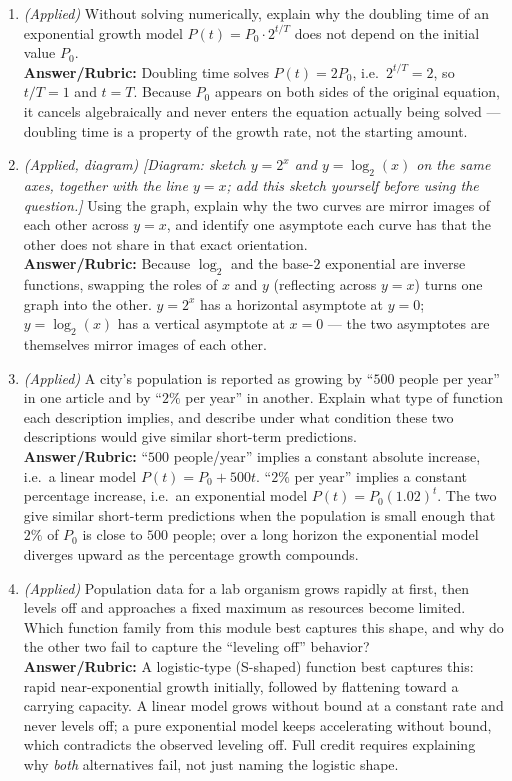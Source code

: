 \documentclass{article}
\begin{document}
\begin{enumerate}[leftmargin=*]
  \item \textit{(Applied)} Without solving numerically, explain why the doubling time of an exponential growth model $P(t)=P_0\cdot2^{t/T}$ does not depend on the initial value $P_0$. \\
  \textbf{Answer/Rubric:} Doubling time solves $P(t)=2P_0$, i.e.\ $2^{t/T}=2$, so $t/T=1$ and $t=T$. Because $P_0$ appears on both sides of the original equation, it cancels algebraically and never enters the equation actually being solved --- doubling time is a property of the growth rate, not the starting amount.

  \item \textit{(Applied, diagram)} \emph{[Diagram: sketch $y=2^x$ and $y=\log_2(x)$ on the same axes, together with the line $y=x$; add this sketch yourself before using the question.]} Using the graph, explain why the two curves are mirror images of each other across $y=x$, and identify one asymptote each curve has that the other does not share in that exact orientation. \\
  \textbf{Answer/Rubric:} Because $\log_2$ and the base-$2$ exponential are inverse functions, swapping the roles of $x$ and $y$ (reflecting across $y=x$) turns one graph into the other. $y=2^x$ has a horizontal asymptote at $y=0$; $y=\log_2(x)$ has a vertical asymptote at $x=0$ --- the two asymptotes are themselves mirror images of each other.

  \item \textit{(Applied)} A city's population is reported as growing by ``$500$ people per year'' in one article and by ``$2\%$ per year'' in another. Explain what type of function each description implies, and describe under what condition these two descriptions would give similar short-term predictions. \\
  \textbf{Answer/Rubric:} ``$500$ people/year'' implies a constant absolute increase, i.e.\ a linear model $P(t)=P_0+500t$. ``$2\%$ per year'' implies a constant percentage increase, i.e.\ an exponential model $P(t)=P_0(1.02)^t$. The two give similar short-term predictions when the population is small enough that $2\%$ of $P_0$ is close to $500$ people; over a long horizon the exponential model diverges upward as the percentage growth compounds.

  \item \textit{(Applied)} Population data for a lab organism grows rapidly at first, then levels off and approaches a fixed maximum as resources become limited. Which function family from this module best captures this shape, and why do the other two fail to capture the ``leveling off'' behavior? \\
  \textbf{Answer/Rubric:} A logistic-type (S-shaped) function best captures this: rapid near-exponential growth initially, followed by flattening toward a carrying capacity. A linear model grows without bound at a constant rate and never levels off; a pure exponential model keeps accelerating without bound, which contradicts the observed leveling off. Full credit requires explaining why \emph{both} alternatives fail, not just naming the logistic shape.
\end{enumerate}
\end{document}
